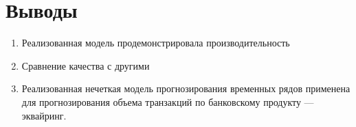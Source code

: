 \section{Выводы}

\begin{enumerate}
	\item Реализованная модель продемонстрировала производительность
	\item Сравнение качества с другими
	\item Реализованная нечеткая модель прогнозирования временных рядов применена для прогнозирования объема транзакций по банковскому продукту --- эквайринг.
\end{enumerate}